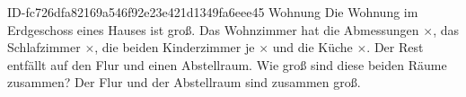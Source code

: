 \begin{exercise}
      {ID-fc726dfa82169a546f92e23e421d1349fa6eee45}
      {Wohnung}
  \ifproblem\problem
    Die Wohnung im Erdgeschoss eines Hauses ist  groß.
    Das Wohnzimmer hat die Abmessungen $\times$,
    das Schlafzimmer $\times$,
    die beiden Kinderzimmer je $\times$
    und die Küche $\times$.
    Der Rest entfällt auf den Flur und einen Abstellraum. Wie groß sind
    diese beiden Räume zusammen?
  \fi
  \ifoutcome\outcome
    Der Flur und der Abstellraum sind zusammen  groß.
  \fi
\end{exercise}
